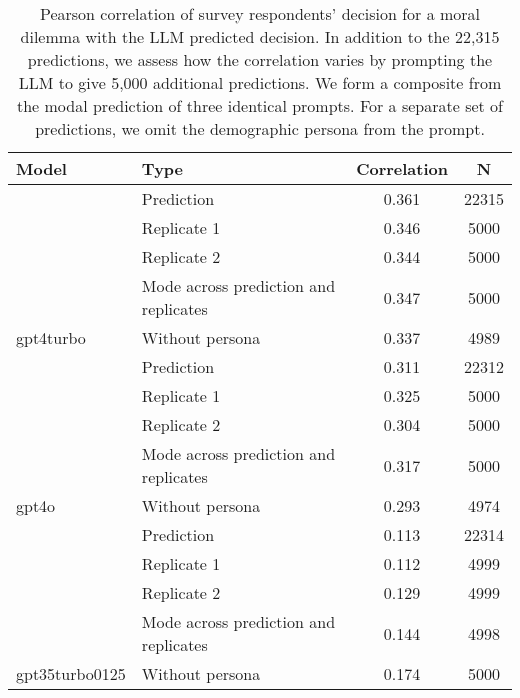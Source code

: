 \begin{table}[!h]
\centering
\caption{\label{tab:corr-tab}Pearson correlation of survey respondents' decision for a moral dilemma with the LLM predicted decision. In addition to the 22,315 predictions, we assess how the correlation varies by prompting the LLM to give 5,000 additional predictions. We form a composite from the modal prediction of three identical prompts. For a separate set of predictions, we omit the demographic persona from the prompt.}
\centering
\begin{tabular}[t]{llcc}
\toprule
Model & Type & Correlation & N\\
\midrule
 & Prediction & 0.361 & 22315\\
\cmidrule{2-4}
 & Replicate 1 & 0.346 & 5000\\
\cmidrule{2-4}
 & Replicate 2 & 0.344 & 5000\\
\cmidrule{2-4}
 & Mode across prediction and replicates & 0.347 & 5000\\
\cmidrule{2-4}
\multirow{-5}{*}{\raggedright\arraybackslash gpt4turbo} & Without persona & 0.337 & 4989\\
\cmidrule{1-4}
 & Prediction & 0.311 & 22312\\
\cmidrule{2-4}
 & Replicate 1 & 0.325 & 5000\\
\cmidrule{2-4}
 & Replicate 2 & 0.304 & 5000\\
\cmidrule{2-4}
 & Mode across prediction and replicates & 0.317 & 5000\\
\cmidrule{2-4}
\multirow{-5}{*}{\raggedright\arraybackslash gpt4o} & Without persona & 0.293 & 4974\\
\cmidrule{1-4}
 & Prediction & 0.113 & 22314\\
\cmidrule{2-4}
 & Replicate 1 & 0.112 & 4999\\
\cmidrule{2-4}
 & Replicate 2 & 0.129 & 4999\\
\cmidrule{2-4}
 & Mode across prediction and replicates & 0.144 & 4998\\
\cmidrule{2-4}
\multirow{-5}{*}{\raggedright\arraybackslash gpt35turbo0125} & Without persona & 0.174 & 5000\\
\bottomrule
\end{tabular}
\end{table}
